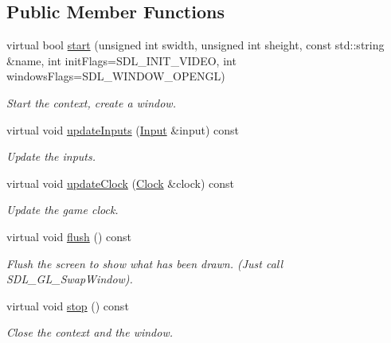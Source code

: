 \subsection*{Public Member Functions}
\begin{DoxyCompactItemize}
\item 
virtual bool \hyperlink{classgdl_1_1_sdl_context_a317e2f02518809a4ff1d4ec381cf29a2}{start} (unsigned int swidth, unsigned int sheight, const std\-::string \&name, int init\-Flags=S\-D\-L\-\_\-\-I\-N\-I\-T\-\_\-\-V\-I\-D\-E\-O, int windows\-Flags=S\-D\-L\-\_\-\-W\-I\-N\-D\-O\-W\-\_\-\-O\-P\-E\-N\-G\-L)
\begin{DoxyCompactList}\small\item\em Start the context, create a window. \end{DoxyCompactList}\item 
virtual void \hyperlink{classgdl_1_1_sdl_context_a899be84a90438d59547155e4aecc2c87}{update\-Inputs} (\hyperlink{classgdl_1_1_input}{Input} \&input) const 
\begin{DoxyCompactList}\small\item\em Update the inputs. \end{DoxyCompactList}\item 
virtual void \hyperlink{classgdl_1_1_sdl_context_aec8807a2f1b9ca64c880286f1046ad2a}{update\-Clock} (\hyperlink{classgdl_1_1_clock}{Clock} \&clock) const 
\begin{DoxyCompactList}\small\item\em Update the game clock. \end{DoxyCompactList}\item 
\hypertarget{classgdl_1_1_sdl_context_a107b456e3df4727c6c32fff36f45faa7}{virtual void \hyperlink{classgdl_1_1_sdl_context_a107b456e3df4727c6c32fff36f45faa7}{flush} () const }\label{classgdl_1_1_sdl_context_a107b456e3df4727c6c32fff36f45faa7}

\begin{DoxyCompactList}\small\item\em Flush the screen to show what has been drawn. (Just call S\-D\-L\-\_\-\-G\-L\-\_\-\-Swap\-Window). \end{DoxyCompactList}\item 
\hypertarget{classgdl_1_1_sdl_context_a02007ea70c7e5a60048c1bb5812b48b6}{virtual void \hyperlink{classgdl_1_1_sdl_context_a02007ea70c7e5a60048c1bb5812b48b6}{stop} () const }\label{classgdl_1_1_sdl_context_a02007ea70c7e5a60048c1bb5812b48b6}

\begin{DoxyCompactList}\small\item\em Close the context and the window. \end{DoxyCompactList}\end{DoxyCompactItemize}
